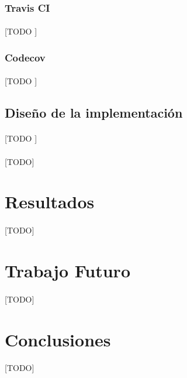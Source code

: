 \documentclass{subfiles}
\begin{document}
        \subsubsection{Travis CI}
        \label{sec:travis}

          \paragraph{}
          [TODO ]

        \subsubsection{Codecov}
        \label{sec:codecov}

          \paragraph{}
          [TODO ]

      \subsection{Diseño de la implementación}
      \label{sec:implementation_design}

        \paragraph{}
        [TODO ]

      \paragraph{}
      [TODO]

    \section{Resultados}
    \label{sec:implementation_results}

      \paragraph{}
      [TODO]

    \section{Trabajo Futuro}
    \label{sec:future_work}

      \paragraph{}
      [TODO]

    \section{Conclusiones}
    \label{sec:implementation_conclusions}

      \paragraph{}
      [TODO]
\end{document}
